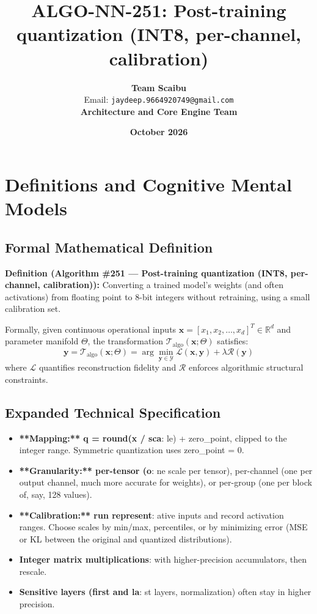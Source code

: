 \documentclass[11pt,a4paper]{article}
\title{\textbf{ALGO-NN-251: Post-training quantization (INT8, per-channel, calibration)}}
\author{\textbf{Team Scaibu} \\ \small Email: \texttt{jaydeep.9664920749@gmail.com} \\ \small \textbf{Architecture and Core Engine Team}}
\date{\textbf{October 2026}}
\theoremstyle{definition}
\begin{document}
\maketitle

\section{Definitions and Cognitive Mental Models}

\subsection{Formal Mathematical Definition}
\textbf{Definition (Algorithm \#251 --- Post-training quantization (INT8, per-channel, calibration)):}
Converting a trained model's weights (and often activations) from floating point to 8-bit integers without retraining, using a small calibration set.

Formally, given continuous operational inputs $\mathbf{x} = [x_1, x_2, \dots, x_d]^T \in \mathbb{R}^d$ and parameter manifold $\Theta$, the transformation $\mathcal{T}_{\text{algo}}(\mathbf{x}; \Theta)$ satisfies:
{\boldmath
\begin{equation}
\mathbf{y} = \mathcal{T}_{\text{algo}}(\mathbf{x}; \Theta) = \arg\min_{\mathbf{y} \in \mathcal{Y}} \mathcal{L}(\mathbf{x}, \mathbf{y}) + \lambda \mathcal{R}(\mathbf{y})
\end{equation}
}
where $\mathcal{L}$ quantifies reconstruction fidelity and $\mathcal{R}$ enforces algorithmic structural constraints.

\subsection{Expanded Technical Specification}
\begin{itemize}
\item \textbf{**Mapping:** q = round(x / sca}: le) + zero\_point, clipped to the integer range. Symmetric quantization uses zero\_point = 0.
\item \textbf{**Granularity:** per-tensor (o}: ne scale per tensor), per-channel (one per output channel, much more accurate for weights), or per-group (one per block of, say, 128 values).
\item \textbf{**Calibration:** run represent}: ative inputs and record activation ranges. Choose scales by min/max, percentiles, or by minimizing error (MSE or KL between the original and quantized distributions).
\item \textbf{Integer matrix multiplications}:  with higher-precision accumulators, then rescale.
\item \textbf{Sensitive layers (first and la}: st layers, normalization) often stay in higher precision.
\end{itemize}
\end{document}
